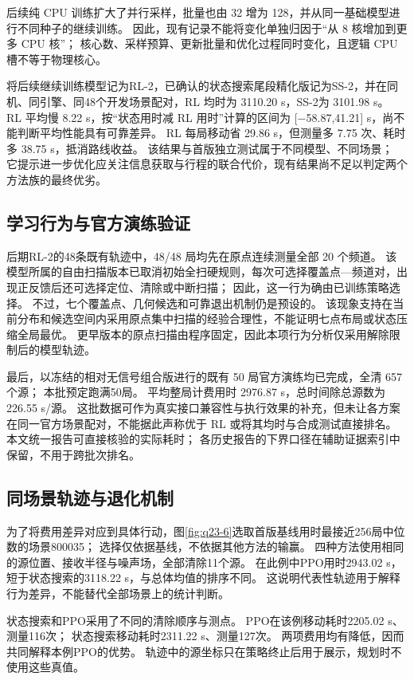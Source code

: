 后续纯 CPU 训练扩大了并行采样，批量也由 32 增为 128，并从同一基础模型进行不同种子的继续训练。
因此，现有记录不能将变化单独归因于``从 8 核增加到更多 CPU 核''；
核心数、采样预算、更新批量和优化过程同时变化，且逻辑 CPU 槽不等于物理核心。

将后续继续训练模型记为RL-2，已确认的状态搜索尾段精化版记为SS-2，并在同机、同引擎、同48个开发场景配对，RL 均时为 3110.20 s，SS-2为 3101.98 s。
RL 平均慢 8.22 s，按``状态用时减 RL 用时''计算的区间为 {[}−58.87,41.21{]} s，尚不能判断平均性能具有可靠差异。
RL 每局移动省 29.86 s，但测量多 7.75 次、耗时多 38.75 s，抵消路线收益。
该结果与首版独立测试属于不同模型、不同场景；
它提示进一步优化应关注信息获取与行程的联合代价，现有结果尚不足以判定两个方法族的最终优劣。

\subsection{学习行为与官方演练验证}\label{sec:q3-12}

后期RL-2的48条既有轨迹中，48/48 局均先在原点连续测量全部 20 个频道。
该模型所属的自由扫描版本已取消初始全扫硬规则，每次可选择覆盖点---频道对，出现正反馈后还可选择定位、清除或中断扫描；
因此，这一行为确由已训练策略选择。
不过，七个覆盖点、几何候选和可靠退出机制仍是预设的。
该现象支持在当前分布和候选空间内采用原点集中扫描的经验合理性，不能证明七点布局或状态压缩全局最优。
更早版本的原点扫描由程序固定，因此本项行为分析仅采用解除限制后的模型轨迹。

最后，以冻结的相对无信号组合版进行的既有 50 局官方演练均已完成，全清 657 个源；
本批预定跑满50局。
平均整局计费用时 2976.87 s，总时间除总源数为 226.55 s/源。
这批数据可作为真实接口兼容性与执行效果的补充，但未让各方案在同一官方场景配对，不能据此声称优于 RL 或将其均时与合成测试直接排名。
本文统一报告可直接核验的实际耗时；
各历史报告的下界口径在辅助证据索引中保留，不用于跨批次排名。

\subsection{同场景轨迹与退化机制}\label{sec:q3-13}

为了将费用差异对应到具体行动，图\ref{fig:q23-6}选取首版基线用时最接近256局中位数的场景800035；
选择仅依据基线，不依据其他方法的输赢。
四种方法使用相同的源位置、接收半径与噪声场，全部清除11个源。
在此例中PPO用时2943.02 s，短于状态搜索的3118.22 s，与总体均值的排序不同。
这说明代表性轨迹用于解释行为差异，不能替代全部场景上的统计判断。

状态搜索和PPO采用了不同的清除顺序与测点。
PPO在该例移动耗时2205.02 s、测量116次；
状态搜索移动耗时2311.22 s、测量127次。
两项费用均有降低，因而共同解释本例PPO的优势。
轨迹中的源坐标只在策略终止后用于展示，规划时不使用这些真值。

